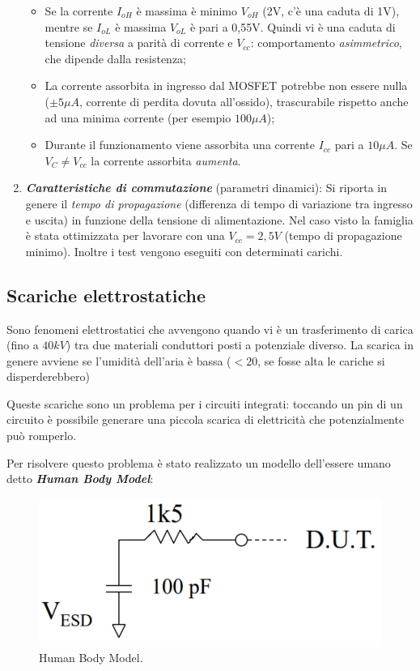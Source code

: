 \documentclass[
]{book}
\providecommand{\tightlist}{%
  \setlength{\itemsep}{0pt}\setlength{\parskip}{0pt}}
\begin{document}
\begin{enumerate}
  \begin{itemize}
  \tightlist
  \item
    Se la corrente \(I_{oH}\) è massima è minimo \(V_{oH}\) (2V, c'è una
    caduta di 1V), mentre se \(I_{oL}\) è massima \(V_{oL}\) è pari a
    0,55V. Quindi vi è una caduta di tensione \emph{diversa} a parità di
    corrente e \(V_{cc}\): comportamento \emph{asimmetrico}, che dipende
    dalla resistenza;
  \item
    La corrente assorbita in ingresso dal MOSFET potrebbe non essere
    nulla (\(\pm 5 \mu A\), corrente di perdita dovuta all'ossido),
    trascurabile rispetto anche ad una minima corrente (per esempio
    \(100\mu A\));
  \item
    Durante il funzionamento viene assorbita una corrente \(I_{cc}\)
    pari a \(10\mu A\). Se \(V_{C}\neq V_{cc}\) la corrente assorbita
    \emph{aumenta}.
  \end{itemize}
\item
  \textbf{\emph{Caratteristiche di commutazione}} (parametri dinamici):
  Si riporta in genere il \emph{tempo di propagazione} (differenza di
  tempo di variazione tra ingresso e uscita) in funzione della tensione
  di alimentazione. Nel caso visto la famiglia è stata ottimizzata per
  lavorare con una \(V_{cc}=2,5V\) (tempo di propagazione minimo).
  Inoltre i test vengono eseguiti con determinati carichi.
\end{enumerate}

\subsection{Scariche elettrostatiche}\label{scariche-elettrostatiche}

Sono fenomeni elettrostatici che avvengono quando vi è un trasferimento
di carica (fino a \(40kV\)) tra due materiali conduttori posti a
potenziale diverso. La scarica in genere avviene se l'umidità dell'aria
è bassa (\(<20%
\), se fosse alta le cariche si disperderebbero)

Queste scariche sono un problema per i circuiti integrati: toccando un
pin di un circuito è possibile generare una piccola scarica di
elettricità che potenzialmente può romperlo.

Per risolvere questo problema è stato realizzato un modello dell'essere
umano detto \textbf{\emph{Human Body Model}}:

\begin{figure}
\centering
\includegraphics[width=0.4\linewidth,height=\textheight,keepaspectratio]{immagini/40.png}
\caption{Human Body Model.}
\end{figure}
\end{document}
